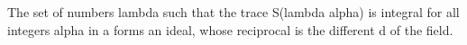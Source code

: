 The set of numbers lambda such that the trace S(lambda alpha) is integral for all integers alpha in a forms an ideal, whose reciprocal is the different d of the field.
